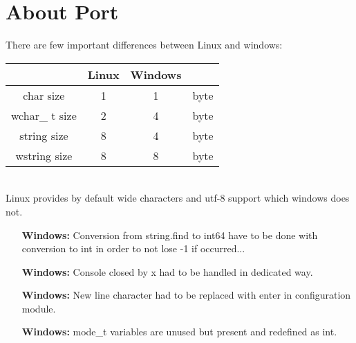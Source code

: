 \hypertarget{AboutPort}{
\section{About Port}
\label{AboutPort}
}

There are few important differences between Linux and windows:\\
\begin{tabular}{|c|c|c|c|}
\hline
  & Linux & Windows & \\ \hline
char size & 1 & 1 & byte\\ \hline
wchar\_ t size & 2 & 4 & byte\\ \hline
string size & 8 & 4 & byte\\ \hline
wstring size & 8 & 8 & byte\\ \hline
\end{tabular}\\
Linux provides by default wide characters and utf-8 support which windows does not.
\begin{itemize}
\item [\textbf{Windows:}]Conversion from string.find to int64 have to be done with conversion to int in order to not lose -1 if occurred...
\item [\textbf{Windows:}]Console closed by x had to be handled in dedicated way.
\item [\textbf{Windows:}]New line character had to be replaced with enter in configuration module.
\item [\textbf{Windows:}]mode\_t variables are unused but present and redefined as int.
\end{itemize}

